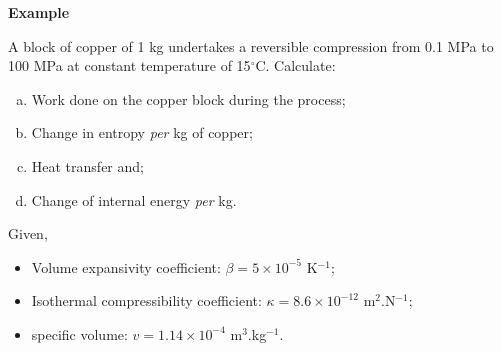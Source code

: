    \begin{MyExample}{\begin{center}{\bf Example}\end{center}}
     \begin{example}\label{Chapter:ThermodynamicPropertiesPureFluids:Example2} 
         A block of copper of 1 kg undertakes a reversible compression from 0.1 MPa to 100 MPa at constant temperature of 15$^{\circ}$C. Calculate:
    \begin{enumerate}[a)]
       \item Work done on the copper block during the process;
       \item Change in entropy {\it per} kg of copper;
       \item Heat transfer and;
       \item Change of internal energy {\it per} kg.
    \end{enumerate}
    Given, 
    \begin{itemize}
       \item Volume expansivity coefficient: $\beta = 5\times 10^{-5}$ K$^{-1}$;
       \item Isothermal compressibility coefficient: $\kappa = 8.6\times 10^{-12}$ m$^{2}$.N$^{-1}$;
       \item specific volume: $v=1.14\times 10^{-4}$ m$^{3}$.kg$^{-1}$.
    \end{itemize} 
     \end{example}


\end{MyExample}
